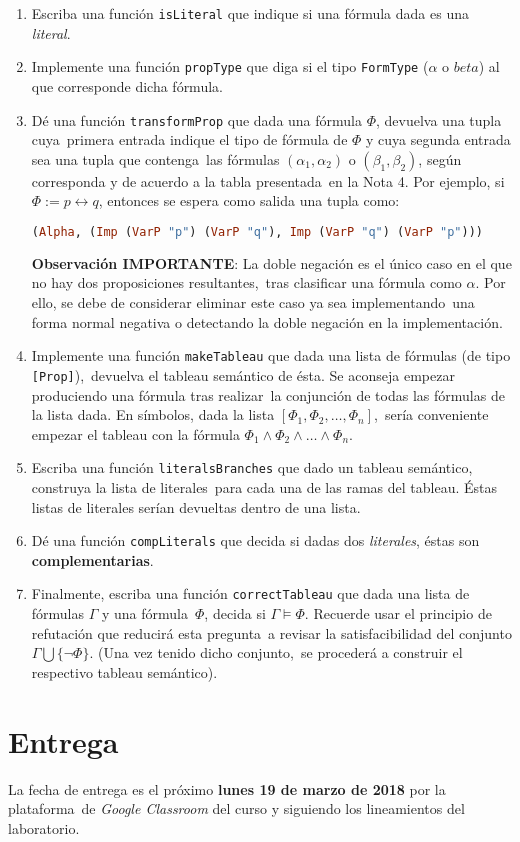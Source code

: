 \documentclass[paper=letter, fontsize=12pt]{scrartcl}
\begin{document}
\begin{enumerate}
\item Escriba una función \verb+isLiteral+ que indique si una fórmula dada es una \emph{literal}.
\item Implemente una función \verb+propType+ que diga si el tipo \verb+FormType+ ($\alpha$ o $beta$)
  al que corresponde dicha fórmula.
\item Dé una función \verb+transformProp+ que dada una fórmula $\Phi$, devuelva una tupla cuya\
  primera entrada indique el tipo de fórmula de $\Phi$ y cuya segunda entrada sea una tupla que contenga\
  las fórmulas $(\alpha_1, \alpha_2)$ o  $(\beta_1, \beta_2)$, según corresponda y de acuerdo a la tabla presentada\
  en la Nota 4. Por ejemplo, si $\Phi := p \leftrightarrow q$, entonces se espera como salida una tupla como:
  \begin{lstlisting}[language=Haskell]
    (Alpha, (Imp (VarP "p") (VarP "q"), Imp (VarP "q") (VarP "p")))
  \end{lstlisting}
  \textbf{Observación IMPORTANTE}: La doble negación es el único caso en el que no hay dos proposiciones resultantes,\
  tras clasificar una fórmula como $\alpha$. Por ello, se debe de considerar eliminar este caso ya sea implementando\
  una forma normal negativa o detectando la doble negación en la implementación.
\item Implemente una función \verb+makeTableau+ que dada una lista de fórmulas (de tipo \verb+[Prop]+),\
  devuelva el tableau semántico de ésta. Se aconseja empezar produciendo una fórmula tras realizar\
  la conjunción de todas las fórmulas de la lista dada. En símbolos, dada la lista $[\Phi_1, \Phi_2,\ldots, \Phi_n]$,\
  sería conveniente empezar el tableau con la fórmula $\Phi_1 \wedge \Phi_2\wedge\ldots\wedge \Phi_n$.
\item Escriba una función \verb+literalsBranches+ que dado un tableau semántico, construya la lista de literales\
  para cada una de las ramas del tableau. Éstas listas de literales serían devueltas dentro de una lista.
\item Dé una función \verb+compLiterals+ que decida si dadas dos \emph{literales}, éstas son \textbf{complementarias}.
\item Finalmente, escriba una función \verb+correctTableau+ que dada una lista de fórmulas $\Gamma$ y una fórmula\
  $\Phi$, decida si $\Gamma \models \Phi$. Recuerde usar el principio de refutación que reducirá esta pregunta\
  a revisar la satisfacibilidad del conjunto $\Gamma \bigcup \{\neg\Phi\}$. (Una vez tenido dicho conjunto,\
  se procederá a construir el respectivo tableau semántico).
\end{enumerate}

\section{Entrega}

\noindent
La fecha de entrega es el próximo \textbf{lunes 19 de marzo de 2018} por la plataforma\
de \emph{Google Classroom} del curso y siguiendo los lineamientos del laboratorio.
\end{document}
